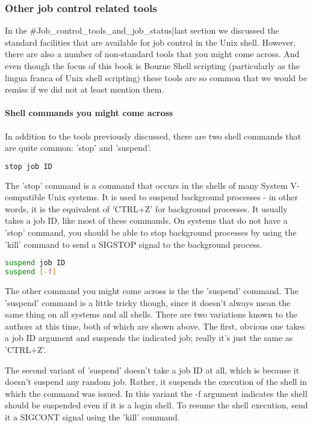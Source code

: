 \subsubsection{Other job control related tools}
In the \#Job\_control\_tools\_and\_job\_status|last section we discussed the
standard facilities that are available for job control in the Unix shell.
However, there are also a number of non-standard tools that you might come
across. And even though the focus of this book is Bourne Shell scripting
(particularly as the lingua franca of Unix shell scripting) these tools are so
common that we would be remiss if we did not at least mention them.

\paragraph{Shell commands you might come across}
In addition to the tools previously discussed, there are two shell commands
that are quite common: 'stop' and 'suspend'.

\lstset{basicstyle=\scriptsize, numbers=left, captionpos=b, tabsize=4}
\begin{lstlisting}[language={bash},xleftmargin=15pt]
stop job ID
\end{lstlisting}

The 'stop' command is a command that occurs in the shells of many System
V-compatible Unix systems. It is used to suspend background processes - in
other words, it is the equivalent of 'CTRL+Z' for background processes. It
usually takes a job ID, like most of these commands. On systems that do not
have a 'stop' command, you should be able to stop background processes by using
the 'kill' command to send a SIGSTOP signal to the background process.

\lstset{basicstyle=\scriptsize, numbers=left, captionpos=b, tabsize=4}
\begin{lstlisting}[language={bash},
xleftmargin=15pt]
suspend job ID 
suspend [-f]
\end{lstlisting}

The other command you might come across is the the 'suspend' command. The
'suspend' command is a little tricky though, since it doesn't always mean the
same thing on all systems and all shells. There are two variations known to the
authors at this time, both of which are shown above. The first, obvious one
takes a job ID argument and suspends the indicated job; really it's just the
same as 'CTRL+Z'. 

The second variant of 'suspend' doesn't take a job ID at all, which is because
it doesn't suspend any random job. Rather, it suspends the execution of the
shell in which the command was issued. In this variant the -f argument
indicates the shell should be suspended even if it is a login shell. To resume
the shell execution, send it a SIGCONT signal using the 'kill' command.

